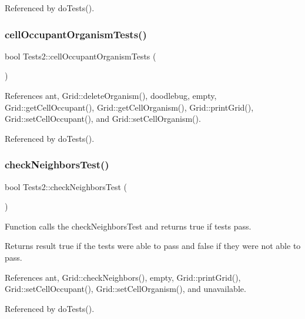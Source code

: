 Referenced by do\+Tests().

\mbox{\label{classTests2_a9ba51b5a047d1f970aa50b1c3f07c650}} 
\subsubsection{cell\+Occupant\+Organism\+Tests()}
{\footnotesize\ttfamily bool Tests2\+::cell\+Occupant\+Organism\+Tests (\begin{DoxyParamCaption}{ }\end{DoxyParamCaption})}



References ant, Grid\+::delete\+Organism(), doodlebug, empty, Grid\+::get\+Cell\+Occupant(), Grid\+::get\+Cell\+Organism(), Grid\+::print\+Grid(), Grid\+::set\+Cell\+Occupant(), and Grid\+::set\+Cell\+Organism().



Referenced by do\+Tests().

\mbox{\label{classTests2_ad48c21e18b306f9e54a261f9778e649f}} 
\subsubsection{check\+Neighbors\+Test()}
{\footnotesize\ttfamily bool Tests2\+::check\+Neighbors\+Test (\begin{DoxyParamCaption}{ }\end{DoxyParamCaption})}

Function calls the check\+Neighbors\+Test and returns true if tests pass.

\begin{DoxyReturn}{Returns}
result true if the tests were able to pass and false if they were not able to pass. 
\end{DoxyReturn}


References ant, Grid\+::check\+Neighbors(), empty, Grid\+::print\+Grid(), Grid\+::set\+Cell\+Occupant(), Grid\+::set\+Cell\+Organism(), and unavailable.



Referenced by do\+Tests().

\mbox{\label{classTests2_a317dc926bf93038f188c999df7a85682}} 
